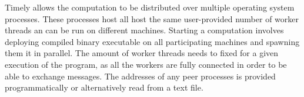 \begin{addedbar}
Timely allows the computation to be distributed over multiple operating system
processes. These processes host all host the same user-provided number of
worker threads an can be run on different machines. Starting a computation
involves deploying compiled binary executable on all participating machines
and spawning them it in parallel.
The amount of worker threads needs to fixed for a given execution of the
program, as all the workers are fully connected in order to be able to exchange
messages. The addresses of any peer processes is provided programmatically
or alternatively read from a text file.

\end{addedbar}
